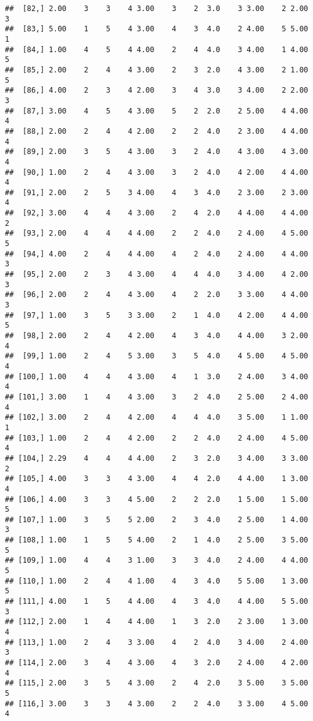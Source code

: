 \documentclass[]{article}
\begin{document}
\begin{verbatim}
##  [82,] 2.00    3    3    4 3.00    3    2  3.0    3 3.00    2 2.00    3
##  [83,] 5.00    1    5    4 3.00    4    3  4.0    2 4.00    5 5.00    1
##  [84,] 1.00    4    5    4 4.00    2    4  4.0    3 4.00    1 4.00    5
##  [85,] 2.00    2    4    4 3.00    2    3  2.0    4 3.00    2 1.00    5
##  [86,] 4.00    2    3    4 2.00    3    4  3.0    3 4.00    2 2.00    3
##  [87,] 3.00    4    5    4 3.00    5    2  2.0    2 5.00    4 4.00    4
##  [88,] 2.00    2    4    4 2.00    2    2  4.0    2 3.00    4 4.00    4
##  [89,] 2.00    3    5    4 3.00    3    2  4.0    4 3.00    4 3.00    4
##  [90,] 1.00    2    4    4 3.00    3    2  4.0    4 2.00    4 4.00    4
##  [91,] 2.00    2    5    3 4.00    4    3  4.0    2 3.00    2 3.00    4
##  [92,] 3.00    4    4    4 3.00    2    4  2.0    4 4.00    4 4.00    2
##  [93,] 2.00    4    4    4 4.00    2    2  4.0    2 4.00    4 5.00    5
##  [94,] 4.00    2    4    4 4.00    4    2  4.0    2 4.00    4 4.00    3
##  [95,] 2.00    2    3    4 3.00    4    4  4.0    3 4.00    4 2.00    3
##  [96,] 2.00    2    4    4 3.00    4    2  2.0    3 3.00    4 4.00    3
##  [97,] 1.00    3    5    3 3.00    2    1  4.0    4 2.00    4 4.00    5
##  [98,] 2.00    2    4    4 2.00    4    3  4.0    4 4.00    3 2.00    4
##  [99,] 1.00    2    4    5 3.00    3    5  4.0    4 5.00    4 5.00    4
## [100,] 1.00    4    4    4 3.00    4    1  3.0    2 4.00    3 4.00    4
## [101,] 3.00    1    4    4 3.00    3    2  4.0    2 5.00    2 4.00    4
## [102,] 3.00    2    4    4 2.00    4    4  4.0    3 5.00    1 1.00    1
## [103,] 1.00    2    4    4 2.00    2    2  4.0    2 4.00    4 5.00    4
## [104,] 2.29    4    4    4 4.00    2    3  2.0    3 4.00    3 3.00    2
## [105,] 4.00    3    3    4 3.00    4    4  2.0    4 4.00    1 3.00    4
## [106,] 4.00    3    3    4 5.00    2    2  2.0    1 5.00    1 5.00    5
## [107,] 1.00    3    5    5 2.00    2    3  4.0    2 5.00    1 4.00    3
## [108,] 1.00    1    5    5 4.00    2    1  4.0    2 5.00    3 5.00    5
## [109,] 1.00    4    4    3 1.00    3    3  4.0    2 4.00    4 4.00    5
## [110,] 1.00    2    4    4 1.00    4    3  4.0    5 5.00    1 3.00    5
## [111,] 4.00    1    5    4 4.00    4    3  4.0    4 4.00    5 5.00    3
## [112,] 2.00    1    4    4 4.00    1    3  2.0    2 3.00    1 3.00    4
## [113,] 1.00    2    4    3 3.00    4    2  4.0    3 4.00    2 4.00    3
## [114,] 2.00    3    4    4 3.00    4    3  2.0    2 4.00    4 2.00    4
## [115,] 2.00    3    5    4 3.00    2    4  2.0    3 5.00    3 5.00    5
## [116,] 3.00    3    3    4 3.00    2    2  4.0    3 3.00    4 5.00    4

\end{verbatim}
\end{document}
